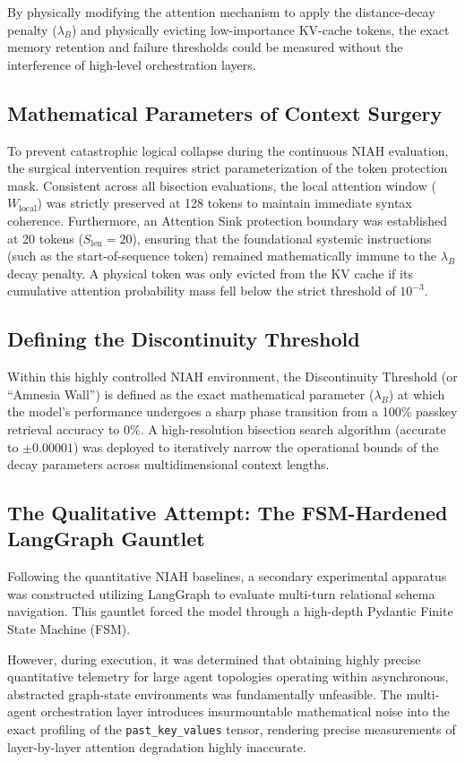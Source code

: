 \documentclass[11pt,a4paper]{article}
\newcommand{\bryanCoeff}{\lambda_B}
\begin{document}
By physically modifying the attention mechanism to apply the distance-decay penalty (\(\bryanCoeff\)) and physically evicting low-importance KV-cache tokens, the exact memory retention and failure thresholds could be measured without the interference of high-level orchestration layers.

\subsection{Mathematical Parameters of Context Surgery}
To prevent catastrophic logical collapse during the continuous NIAH evaluation, the surgical intervention requires strict parameterization of the token protection mask. Consistent across all bisection evaluations, the local attention window (\(W_{\text{local}}\)) was strictly preserved at 128 tokens to maintain immediate syntax coherence. Furthermore, an Attention Sink protection boundary was established at 20 tokens (\(S_{\text{len}} = 20\)), ensuring that the foundational systemic instructions (such as the start-of-sequence token) remained mathematically immune to the \(\bryanCoeff\) decay penalty. A physical token was only evicted from the KV cache if its cumulative attention probability mass fell below the strict threshold of \(10^{-3}\).

\subsection{Defining the Discontinuity Threshold}
Within this highly controlled NIAH environment, the Discontinuity Threshold (or ``Amnesia Wall'') is defined as the exact mathematical parameter (\(\bryanCoeff\)) at which the model's performance undergoes a sharp phase transition from a 100\% passkey retrieval accuracy to 0\%. A high-resolution bisection search algorithm (accurate to \(\pm 0.00001\)) was deployed to iteratively narrow the operational bounds of the decay parameters across multidimensional context lengths.

\subsection{The Qualitative Attempt: The FSM-Hardened LangGraph Gauntlet}
Following the quantitative NIAH baselines, a secondary experimental apparatus was constructed utilizing LangGraph to evaluate multi-turn relational schema navigation. This gauntlet forced the model through a high-depth Pydantic Finite State Machine (FSM). 

However, during execution, it was determined that obtaining highly precise quantitative telemetry for large agent topologies operating within asynchronous, abstracted graph-state environments was fundamentally unfeasible. The multi-agent orchestration layer introduces insurmountable mathematical noise into the exact profiling of the \verb|past_key_values| tensor, rendering precise measurements of layer-by-layer attention degradation highly inaccurate.
\end{document}
